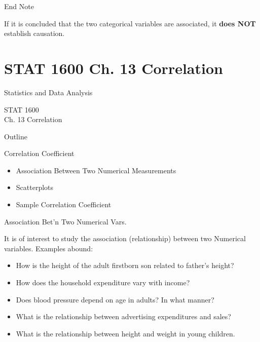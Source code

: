 \documentclass[14pt]{beamer}\usepackage[]{graphicx}\usepackage[]{color}
\begin{document}
\begin{frame}[fragile]{End Note}

If it is concluded that the two categorical variables are associated, it  \textbf{does NOT} establish causation.

\end{frame}










\section{STAT 1600 Ch. 13 Correlation}

\begin{frame}[fragile]{Statistics and Data Analysis}

STAT 1600 \\ Ch. 13 Correlation

\end{frame}

\begin{frame}[fragile]{Outline}

Correlation Coefficient

\begin{itemize}
\item Association Between Two Numerical Measurements  
\item Scatterplots
\item Sample Correlation Coefficient
\end{itemize}
\end{frame}

\begin{frame}[fragile]{Association Bet'n Two Numerical Vars.}

It is of interest to study the association (relationship) between two  Numerical variables. Examples abound:

\begin{itemize}
\item<1-> How is the height of the adult firstborn son related to father's height? \item<2-> How does the household expenditure vary with income?
\item<3-> Does blood pressure depend on age in adults? In what manner?  
\item<4-> What is the relationship between advertising expenditures and sales?  
\item<5-> What is the relationship between height and weight in young children.
\end{itemize}
\end{frame}
\end{document}
